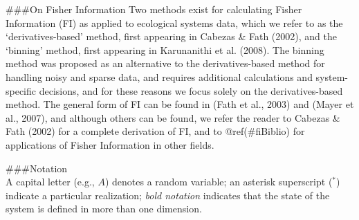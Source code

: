 \documentclass[12pt,twoside]{reedthesis}
\begin{document}
\#\#\#On Fisher Information
Two methods exist for calculating Fisher Information (FI) as applied to ecological systems data, which we refer to as the `derivatives-based' method, first appearing in Cabezas \& Fath (2002), and the `binning' method, first appearing in Karunanithi et al. (2008). The binning method was proposed as an alternative to the derivatives-based method for handling noisy and sparse data, and requires additional calculations and system-specific decisions, and for these reasons we focus solely on the derivatives-based method. The general form of FI can be found in (Fath et al., 2003) and (Mayer et al., 2007), and although others can be found, we refer the reader to Cabezas \& Fath (2002) for a complete derivation of FI, and to @ref(\#fiBiblio) for applications of Fisher Information in other fields.

\#\#\#Notation\\
A capital letter (e.g., \(A\)) denotes a random variable; an asterisk superscript (\(^*\)) indicate a particular realization; \emph{bold notation} indicates that the state of the system is defined in more than one dimension.
\end{document}
